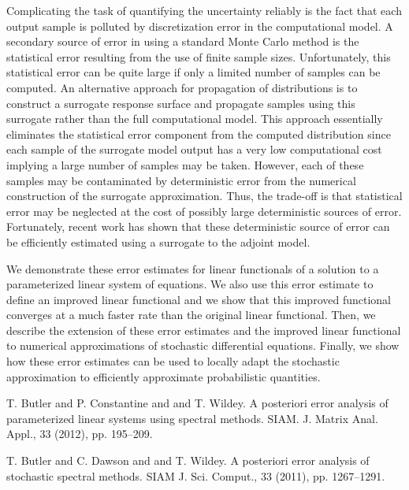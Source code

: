\documentclass[article, A4, 11pt]{llncs}%
\begin{document}
Complicating the task of quantifying the uncertainty reliably is the fact that each output sample is polluted by discretization error in the computational model.  A secondary source of error in using a standard Monte Carlo method is the statistical error resulting from the use of finite sample sizes. Unfortunately, this statistical error can be quite large if only a limited number of samples can be computed. An alternative approach for propagation of distributions is to construct a surrogate response surface and propagate samples using this surrogate rather than the full computational model. This approach essentially eliminates the statistical error component from the computed distribution since each sample of the surrogate model output has a very low computational cost implying a large number of samples may be taken.  However, each of these samples may be contaminated by deterministic error from the numerical construction of the surrogate approximation. Thus, the trade-off is that statistical error may be neglected at the cost of possibly large deterministic sources of error.  Fortunately, recent work has shown that these deterministic source of error can be efficiently estimated using a surrogate to the adjoint model.

We demonstrate these error estimates for linear functionals of a solution to a parameterized linear system of equations.  We also use this error estimate to define an improved linear functional and we show that this improved functional converges at a much faster rate than the original linear functional.  Then, we describe the extension of these error estimates and the improved linear functional to numerical approximations of stochastic differential equations.  Finally, we show how these error estimates can be used to locally adapt the stochastic approximation to efficiently approximate probabilistic quantities.


\begin{thebibliography}{10}
{\sc T. Butler and P. Constantine and and T. Wildey}. {A posteriori error analysis of parameterized linear systems using spectral methods}.  SIAM. J. Matrix Anal. Appl., 33 (2012), pp. 195–209.

{\sc T. Butler and C. Dawson and and T. Wildey}. {A posteriori error analysis of stochastic spectral methods}.  SIAM J. Sci. Comput., 33 (2011), pp. 1267–1291.
\end{thebibliography} %
\end{document}

